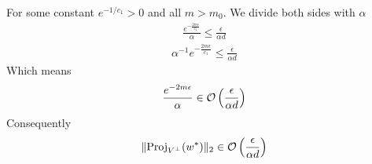 \documentclass[a4paper, english, headtopline=0.08em, headsepline=0.04em, left = 1cm, right = 1cm, DIV=15]{article}
\begin{document}
For some constant $e^{-1/c_1}>0$ and all $m > m_0$. We divide both sides with $\alpha$
\begin{align*}
	\frac{e^{-\frac{2m\epsilon}{c_1}}}{\alpha} \leq \frac{\epsilon}{\alpha d}
\end{align*}
\begin{align*}
	{\alpha}^{-1}{e^{-\frac{2m\epsilon}{c_1}}} \leq \frac{\epsilon}{\alpha d}
\end{align*}
Which means
\begin{align*}
	\frac{e^{-{2m\epsilon}}}{\alpha} \in \mathcal{O}\left(\frac{\epsilon}{\alpha d}\right) 
\end{align*}
Consequently
\begin{align*}
	\|\text{Proj}_{V^{\bot }}(w^*)\|_2 \in \mathcal{O}\left(\frac{\epsilon}{\alpha d}\right) 
\end{align*}
\end{document}
